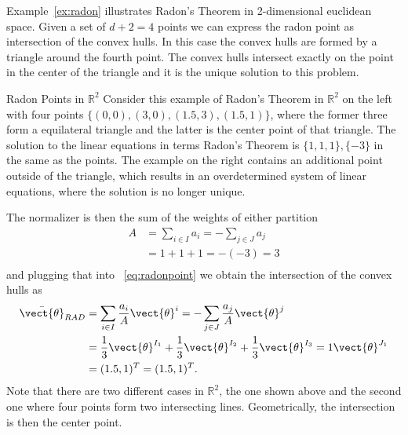Example~\ref{ex:radon} illustrates Radon's Theorem in 2-dimensional euclidean space.
Given a set of $d+2 =4$ points we can express the radon point as intersection of the convex hulls.
In this case the convex hulls are formed by a triangle around the fourth point.
The convex hulls intersect exactly on the point in the center of the triangle and it is the unique solution to this problem.

\begin{example}{Radon Points in $\mathbb{R}^2$}
    \label{ex:radon}
    Consider this example of Radon's Theorem in $\mathbb{R}^2$ on the left with four points $\{(0,0), (3,0), (1.5, 3), (1.5,1)\}$, where the former three form a equilateral triangle and the latter is the center point of that triangle.
    The solution to the linear equations in terms Radon's Theorem is $\{1,1,1\},\{-3\}$ in the same as  the points. 
    The example on the right contains an additional point outside of the triangle, which results in an overdetermined system of linear equations, where the solution is no longer unique.
    
     
    The normalizer is then the sum of the weights of either partition
    \begin{equation}
        \begin{split}
            A &= \sum_{i\in I} a_i = - \sum_{j \in J} a_j \\
            &= 1 + 1 + 1 = -(-3) = 3 \\
        \end{split}
    \end{equation}
    and plugging that into \eq~\ref{eq:radonpoint} we obtain the intersection of the convex hulls as
    \begin{equation}
        \begin{split}
            \bar{\vect{\theta}}_{RAD} &= \sum_{i\in I} \frac{a_i}{A} \vect{\theta}^i = - \sum_{j \in J} \frac{a_j}{A} \vect{\theta}^j \\
            &= \frac{1}{3} \vect{\theta}^{I_1} + \frac{1}{3} \vect{\theta}^{I_2} + \frac{1}{3} \vect{\theta}^{I_3} = 1 \vect{\theta}^{J_1} \\
            & =  (1.5, 1)^T = (1.5, 1)^T.
        \end{split}
    \end{equation}
    Note that there are two different cases in $\mathbb{R}^2$, the one shown above and the second one where four points form two intersecting lines. Geometrically, the intersection is then the center point.

\end{example}
   

